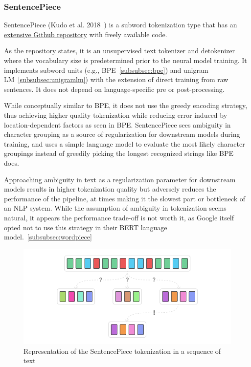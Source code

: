 \subsubsection{SentencePiece}

SentencePiece (Kudo et al. 2018~\cite{kudo2018sentencepiece}) is a subword tokenization type that has an \href{https://github.com/google/sentencepiece}{extensive Github repository} with freely available code.

As the repository states, it is an unsupervised text tokenizer and detokenizer where the vocabulary size is predetermined prior to the neural model training. It implements subword units (e.g., BPE~\ref{subsubsec:bpe}) and unigram LM~\ref{subsubsec:unigramlm}) with the extension of direct training from raw sentences. It does not depend on language-specific pre or post-processing.

While conceptually similar to BPE, it does not use the greedy encoding strategy, thus achieving higher quality tokenization while reducing error induced by location-dependent factors as seen in BPE. SentencePiece sees ambiguity in character grouping as a source of regularization for downstream models during training, and uses a simple language model to evaluate the most likely character groupings instead of greedily picking the longest recognized strings like BPE does.

Approaching ambiguity in text as a regularization parameter for downstream models results in higher tokenization quality but adversely reduces the performance of the pipeline, at times making it the slowest part or bottleneck of an NLP system. While the assumption of ambiguity in tokenization seems natural, it appears the performance trade-off is not worth it, as Google itself opted not to use this strategy in their BERT language model.~\ref{subsubsec:wordpiece}

\begin{figure}[!ht]
    \centering
    \includegraphics[width=14cm]{figures/sentencepiece.png}
    \caption{Representation of the SentencePiece tokenization in a sequence of text}
\end{figure}

